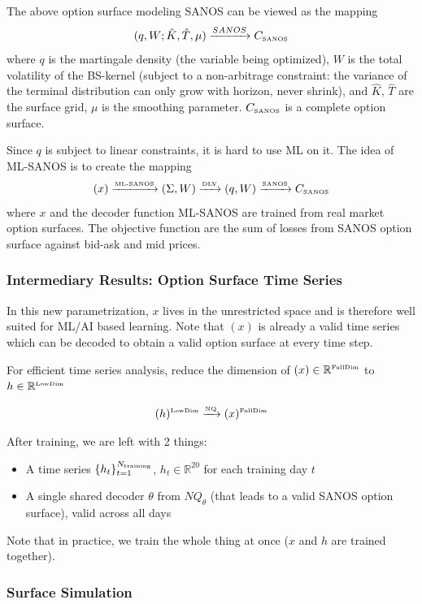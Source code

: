 \documentclass[11pt]{article}
\begin{document}
The above option surface modeling SANOS can be viewed as the mapping
$$
(q, W; \hat{K}, \hat{T}, \mu) \xrightarrow{SANOS} C_{\text{\tiny SANOS}}
$$
where $q$ is the martingale density (the variable being optimized), $W$ is the total volatility of the BS-kernel (subject to a non-arbitrage constraint: the variance of the terminal distribution can only grow with horizon, never shrink), and $\hat{K}$, $\hat{T}$ are the surface grid, $\mu$ is the smoothing parameter. $C_{\text{\tiny SANOS}}$ is a complete option surface.

Since $q$ is subject to linear constraints, it is hard to use ML on it. The idea of ML-SANOS is to create the mapping
$$
(x) \xrightarrow{\text{\tiny ML-SANOS}}
(\Sigma, W) \xrightarrow{\text{\tiny DLV}} (q, W) \xrightarrow{\text{\tiny SANOS}} C_{\text{\tiny SANOS}}
$$
where $x$ and the decoder function ML-SANOS are trained from real market option surfaces. The objective function are the sum of losses from SANOS option surface against bid-ask and mid prices.

\subsubsection*{Intermediary Results: Option Surface Time Series}

In this new parametrization, $x$ lives in the unrestricted space and is therefore well suited for ML/AI based learning. Note that $(x)$ is already a valid time series which can be decoded to obtain a valid option surface at every time step.

For efficient time series analysis, reduce the dimension of $(x) \in \mathbb{R}^{\text{\tiny FullDim}}$ to $h \in \mathbb{R}^{\text{\tiny LowDim}}$

$$
(h)^{\text{\tiny LowDim}} \xrightarrow{\text{\tiny NQ}} (x)^{\text{\tiny FullDim}}
$$

After training, we are left with 2 things:
\begin{itemize}
    \item A time series $\{h_t\}_{t=1}^{N_{\text{\tiny training}}}$, $h_t \in \mathbb{R}^{20}$ for each training day $t$
    \item A single shared decoder $\theta$ from $NQ_{\theta}$ (that leads to a valid SANOS option surface), valid across all days
\end{itemize}

Note that in practice, we train the whole thing at once ($x$ and $h$ are trained together).

\subsubsection*{Surface Simulation}
\end{document}
